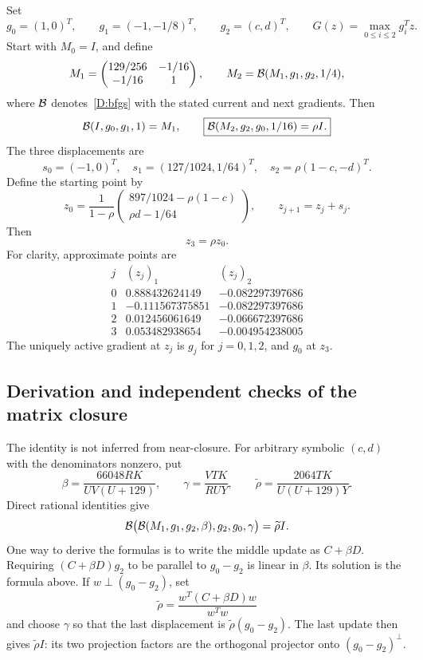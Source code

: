 Set
\[
 g_0=(1,0)^T,\qquad g_1=(-1,-1/8)^T,\qquad g_2=(c,d)^T,
 \qquad G(z)=\max_{0\le i\le2}g_i^Tz.
\]
Start with $M_0=I$, and define
\[
 M_1=\begin{pmatrix}129/256&-1/16\\-1/16&1\end{pmatrix},
 \qquad M_2=\mathcal B(M_1,g_1,g_2,1/4),
\]
where $\mathcal B$ denotes~\eqref{D:bfgs} with the stated current and next gradients. Then
\begin{equation}\label{D:closure}
 \mathcal B(I,g_0,g_1,1)=M_1,\qquad
 \boxed{\mathcal B(M_2,g_2,g_0,1/16)=\rho I.}
\end{equation}
The three displacements are
\begin{equation}\label{D:steps}
 s_0=(-1,0)^T,\quad s_1=(127/1024,1/64)^T,\quad
 s_2=\rho(1-c,-d)^T.
\end{equation}
Define the starting point by
\begin{equation}\label{D:x0}
 z_0=\frac1{1-\rho}
 \begin{pmatrix}897/1024-\rho(1-c)\\ \rho d-1/64\end{pmatrix},
 \qquad z_{j+1}=z_j+s_j.
\end{equation}
Then
\[
 \boxed{z_3=\rho z_0.}
\]
For clarity, approximate points are
\[
\begin{array}{c|rr}
 j& (z_j)_1&(z_j)_2\\\hline
0& 0.888432624149&-0.082297397686\\
1&-0.111567375851&-0.082297397686\\
2& 0.012456061649&-0.066672397686\\
3& 0.053482938654&-0.004954238005
\end{array}
\]
The uniquely active gradient at $z_j$ is $g_j$ for $j=0,1,2$, and $g_0$ at $z_3$.

\subsection{Derivation and independent checks of the matrix closure}
The identity is not inferred from near-closure. For arbitrary symbolic $(c,d)$ with the denominators nonzero, put
\[
 \beta=\frac{66048RK}{UV(U+129)},\qquad
 \gamma=\frac{VTK}{RUY},\qquad
 \widetilde\rho=\frac{2064TK}{U(U+129)Y}.
\]
Direct rational identities give
\[
 \mathcal B\bigl(\mathcal B(M_1,g_1,g_2,\beta),g_2,g_0,\gamma\bigr)
 =\widetilde\rho I.
\]
One way to derive the formulas is to write the middle update as $C+\beta D$. Requiring $(C+\beta D)g_2$ to be parallel to $g_0-g_2$ is linear in $\beta$. Its solution is the formula above. If $w\perp(g_0-g_2)$, set
\[
 \widetilde\rho=\frac{w^T(C+\beta D)w}{w^Tw}
\]
and choose $\gamma$ so that the last displacement is $\widetilde\rho(g_0-g_2)$. The last update then gives $\widetilde\rho I$: its two projection factors are the orthogonal projector onto $(g_0-g_2)^\perp$.

